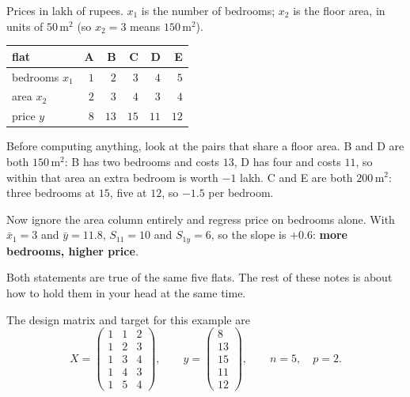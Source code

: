 \documentclass[11pt]{article}
\begin{document}
\begin{worked}
Prices in lakh of rupees. $x_1$ is the number of bedrooms; $x_2$ is the floor
area, in units of $50\,\mathrm{m}^2$ (so $x_2 = 3$ means $150\,\mathrm{m}^2$).
\begin{center}
\begin{tabular}{@{}lrrrrr@{}}
\toprule
flat & A & B & C & D & E\\
\midrule
bedrooms $x_1$ & $1$ & $2$ & $3$ & $4$ & $5$\\
area $x_2$     & $2$ & $3$ & $4$ & $3$ & $4$\\
\midrule
price $y$      & $8$ & $13$ & $15$ & $11$ & $12$\\
\bottomrule
\end{tabular}
\end{center}
Before computing anything, look at the pairs that share a floor area. B and D
are both $150\,\mathrm{m}^2$: B has two bedrooms and costs $13$, D has four
and costs $11$, so within that area an extra bedroom is worth $-1$ lakh. C and
E are both $200\,\mathrm{m}^2$: three bedrooms at $15$, five at $12$, so
$-1.5$ per bedroom.

Now ignore the area column entirely and regress price on bedrooms alone. With
$\bar x_1 = 3$ and $\bar y = 11.8$, $S_{11} = 10$ and $S_{1y} = 6$, so the
slope is $+0.6$: \textbf{more bedrooms, higher price}.

Both statements are true of the same five flats. The rest of these notes is
about how to hold them in your head at the same time.
\end{worked}

The design matrix and target for this example are
\[
  X = \begin{pmatrix}
    1 & 1 & 2\\ 1 & 2 & 3\\ 1 & 3 & 4\\ 1 & 4 & 3\\ 1 & 5 & 4
  \end{pmatrix},
  \qquad
  y = \begin{pmatrix} 8\\13\\15\\11\\12 \end{pmatrix},
  \qquad n = 5, \quad p = 2 .
\]

\notesources{\AMLUnitVSources}

\end{document}
